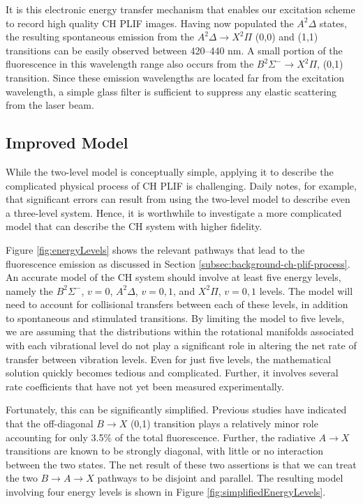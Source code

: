 It is this electronic energy transfer mechanism that enables our excitation scheme to record high quality CH PLIF images.
Having now populated the \(A^2\Delta\) states, the resulting spontaneous emission from the \(A^2\Delta\rightarrow X^2\Pi\) (0,0) and (1,1) transitions can be easily observed between 420--440 nm.
A small portion of the fluorescence in this wavelength range also occurs from the \(B^2\Sigma^-\rightarrow X^2\Pi\), (0,1) transition.
Since these emission wavelengths are located far from the excitation wavelength, a simple glass filter is sufficient to suppress any elastic scattering from the laser beam.

\subsection{Improved Model}
\label{subsec:chplif-improved-model}

While the two-level model is conceptually simple, applying it to describe the complicated physical process of CH PLIF is challenging.
Daily\cite{1997-daily} notes, for example, that significant errors can result from using the two-level model to describe even a three-level system.
Hence, it is worthwhile to investigate a more complicated model that can describe the CH system with higher fidelity.



Figure \ref{fig:energyLevels} shows the relevant pathways that lead to the fluorescence emission as discussed in Section \ref{subsec:background-ch-plif-process}.
An accurate model of the CH system should involve at least five energy levels, namely the \(B^2\Sigma^-\), \(v=0\), \(A^2\Delta\), \(v=0,1\), and \(X^2\Pi\), \(v=0,1\) levels.
The model will need to account for collisional transfers between each of these levels, in addition to spontaneous and stimulated transitions.
By limiting the model to five levels, we are assuming that the distributions within the rotational manifolds associated with each vibrational level do not play a significant role in altering the net rate of transfer between vibration levels.
Even for just five levels, the mathematical solution quickly becomes tedious and complicated.
Further, it involves several rate coefficients that have not yet been measured experimentally.

Fortunately, this can be significantly simplified.
Previous studies\cite{1996-luque-c,2000-luque} have indicated that the off-diagonal \(B\rightarrow X\) (0,1) transition plays a relatively minor role accounting for only 3.5\% of the total fluorescence.
Further, the radiative \(A\rightarrow X\) transitions are known\cite{1996-luque-b} to be strongly diagonal, with little or no interaction\cite{1985-garland-b} between the two states.
The net result of these two assertions is that we can treat the two \(B\rightarrow A\rightarrow X\) pathways to be disjoint and parallel.
The resulting model involving four energy levels is shown in Figure \ref{fig:simplifiedEnergyLevels}.

